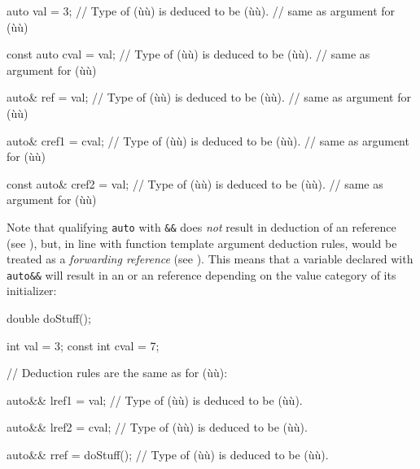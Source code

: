 \begin{emcppslisting}
auto val = 3;
    // Type of (ù{}ù) is deduced to be (ù{}ù).
    // same as argument for (ù{}ù)

const auto cval = val;
    // Type of (ù{}ù) is deduced to be (ù{}ù).
    // same as argument for (ù{}ù)

auto& ref = val;
    // Type of (ù{}ù) is deduced to be (ù{}ù).
    // same as argument for (ù{}ù)

auto& cref1 = cval;
    // Type of (ù{}ù) is deduced to be (ù{}ù).
    // same as argument for (ù{}ù)

const auto& cref2 = val;
    // Type of (ù{}ù) is deduced to be (ù{}ù).
    // same as argument for (ù{}ù)
\end{emcppslisting}
    
\noindent Note that qualifying \lstinline!auto! with \lstinline!&&!
does \emph{not} result in deduction of an  reference (see
), but, in line with function template
argument deduction rules, would be treated as a \emph{forwarding
reference} (see ). This means that a
variable declared with \lstinline!auto&&! will result in an  or an
 reference depending on the value category of its initializer:

\begin{emcppslisting}[emcppsbatch={e1,e2}]
double doStuff();

      int val  = 3;
const int cval = 7;

// Deduction rules are the same as for (ù{}ù):

auto&& lref1 = val;
    // Type of (ù{}ù) is deduced to be (ù{}ù).

auto&& lref2 = cval;
    // Type of (ù{}ù) is deduced to be (ù{}ù).

auto&& rref = doStuff();
    // Type of (ù{}ù) is deduced to be (ù{}ù).
\end{emcppslisting}
    
